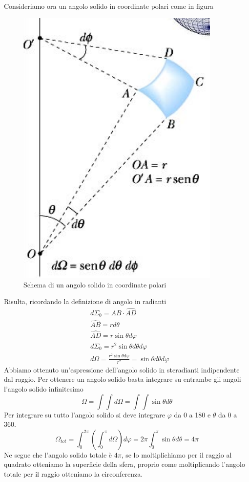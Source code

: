 \documentclass[10pt,a4paper]{article}
\begin{document}
Consideriamo ora un angolo solido in coordinate polari come in figura 
\begin{figure}[h!]
	\centering
	\includegraphics[width=0.5\linewidth]{images/angolo_solido}
	\caption{Schema di un angolo solido in coordinate polari}
	\label{fig:angolosolido}
\end{figure}
\FloatBarrier
Risulta, ricordando la definizione di angolo in radianti
\begin{align*}
	&d\Sigma_0 = \hat{AB}\cdot\hat{AD}\\
	&\hat{AB}=rd\theta\\
	&\hat{AD}=r\sin\theta d\varphi\\
	&d\Sigma_0 = r^2\sin\theta d\theta d\varphi\\
	&d\Omega = \frac{r^2 \sin\theta d\varphi}{r^2} = \sin\theta d\theta d\varphi
\end{align*}
Abbiamo ottenuto un'espressione dell'angolo solido in steradianti indipendente dal raggio. Per ottenere un angolo solido basta integrare su entrambe gli angoli l'angolo solido infinitesimo
\[\Omega = \int\int d\Omega = \int \int \sin\theta d\theta\]
Per integrare su tutto l'angolo solido si deve integrare \(\varphi\) da 0 a 180 e $\theta$ da 0 a 360. 
\[\Omega_{tot} = \int^{2\pi}_{0}\left(\int^{\pi}_{0} d\Omega\right)d\varphi = 2\pi \int^\pi_{0} \sin\theta d\theta = 4\pi\]
Ne segue che l'angolo solido totale è 4$\pi$, se lo moltiplichiamo per il raggio al quadrato otteniamo la superficie della sfera, proprio come moltiplicando l'angolo totale per il raggio otteniamo la circonferenza.\\\\
\end{document}
